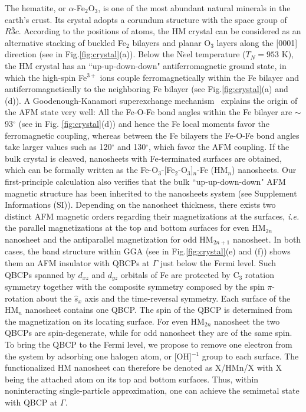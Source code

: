 \documentclass[twocolumn,english,prb,showpacs]{revtex4-1}
\begin{document}
The hematite, or $\alpha$-Fe$_2$O$_3$, is one of the most abundant natural minerals in the earth's crust. Its crystal adopts a corundum structure with the space group of $R\bar{3}c$. According to the positions of atoms, the HM crystal can be considered as an alternative stacking of buckled Fe$_2$ bilayers and planar O$_3$ layers along the [0001] direction (see in Fig.\ref{fig:crystal}(a)). Below the N$\acute{e}$el temperature ($T_N=953$ K), the HM crystal has an ``up-up-down-down" antiferromagnetic ground state, in which the high-spin Fe$^{3+}$ ions couple ferromagnetically within the Fe bilayer and antiferromagnetically to the neighboring Fe bilayer (see Fig.\ref{fig:crystal}(a) and (d)). A Goodenough-Kanamori superexchange mechanism~\cite{goodenough1963,kanamori1959} explains the origin of the AFM state very well: All the Fe-O-Fe bond angles within the Fe bilayer are $\sim$93$^\circ$ (see in Fig. \ref{fig:crystal}(d)) and hence the Fe local moments favor the ferromagnetic coupling, whereas between the Fe bilayers the Fe-O-Fe bond angles take larger values such as 120$^\circ$ and 130$^\circ$, which favor the AFM coupling. If the bulk crystal is cleaved, nanosheets with Fe-terminated surfaces are obtained, which can be formally written as the Fe-O$_3$-[Fe$_2$-O$_3$]$_n$-Fe (HM$_n$) nanosheets. Our first-principle calculation also verifies that the bulk ``up-up-down-down" AFM magnetic structure has been inherited to the nanosheets system (see Supplement Informations (SI)). Depending on the nanosheet thickness, there exists two distinct AFM magnetic orders regarding their magnetizations at the surfaces, \textit{i.e.} the parallel magnetizations at the top and bottom surfaces for even HM$_{2n}$ nanosheet and the antiparallel magnetization for odd HM$_{2n+1}$ nanosheet. {In both cases, the band structure within GGA (see in Fig.\ref{fig:crystal}(e) and (f)) shows them an AFM insulator with QBCPs at $\Gamma$ just below the Fermi level. Such QBCPs spanned by $d_{xz}$ and $d_{yz}$ orbitals of Fe are protected by C$_3$ rotation symmetry \cite{Liang2016Top} together with the composite symmetry composed by the spin $\pi$-rotation about the $\hat{s}_x$ axis and the time-reversal symmetry. {Each surface of the HM$_n$ nanosheet contains one QBCP. The spin of the QBCP is determined from the magnetization on its locating surface. For even HM$_{2n}$ nanosheet the two QBCPs are spin-degenerate, while for odd nanosheet they are of the same spin.} To bring the QBCP to the Fermi level, we propose to remove one electron from the system by adsorbing one halogen atom, or [OH]$^{-1}$ group to each surface. The functionalized HM nanosheet can therefore be denoted as X/HMn/X with X being the attached atom on its top and bottom surfaces. Thus, within noninteracting single-particle approximation, one can achieve the semimetal state with QBCP at $\Gamma$.}
\end{document}
